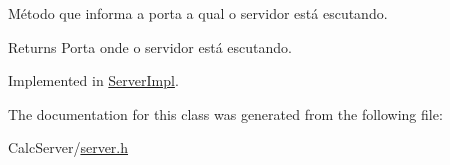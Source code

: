 Método que informa a porta a qual o servidor está escutando. 

\begin{DoxyReturn}{Returns}
Porta onde o servidor está escutando. 
\end{DoxyReturn}


Implemented in \hyperlink{classServerImpl_a769680151e32d74aeae35dfbb1dcbde0}{Server\+Impl}.



The documentation for this class was generated from the following file\+:\begin{DoxyCompactItemize}
\item 
Calc\+Server/\hyperlink{server_8h}{server.\+h}\end{DoxyCompactItemize}
